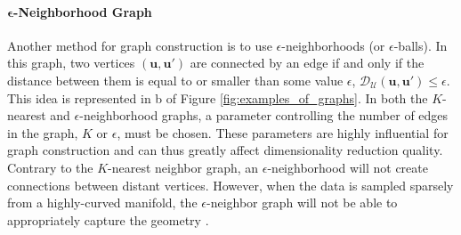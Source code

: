 \paragraph{$\bm{\epsilon}$-Neighborhood Graph}
Another method for graph construction is to use $\epsilon$-neighborhoods (or $\epsilon$-balls).  In this graph, two vertices $(\bm{u},\bm{u}')$ are connected by an edge if and only if the distance between them is equal to or smaller than some value $\epsilon$, $\mathcal{D}_{\mathcal{U}}(\bm{u},\bm{u}') \leq \epsilon$.  This idea is represented in b of Figure \ref{fig:examples_of_graphs}.  In both the $K$-nearest and $\epsilon$-neighborhood graphs, a parameter controlling the number of edges in the graph, $K$ or $\epsilon$, must be chosen.   These parameters are highly influential for graph construction and can thus greatly affect dimensionality reduction quality.  Contrary to the $K$-nearest neighbor graph, an $\epsilon$-neighborhood will not create connections between distant vertices.  However, when the data is sampled sparsely from a highly-curved manifold, the $\epsilon$-neighbor graph will not be able to appropriately capture the geometry \citep{Thorstensen2009ManifoldThesis}.

